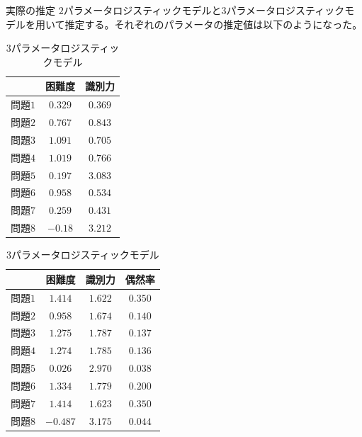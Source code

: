 \documentclass[aspectratio=169, dvipdfmx, 12pt]{beamer}
\begin{document}
\begin{frame}
  \begin{block}{実際の推定}
    $2$パラメータロジスティックモデルと$3$パラメータロジスティックモデルを用いて推定する。それぞれのパラメータの推定値は以下のようになった。
    \begin{table}[H]
      \begin{minipage}[t]{.45\textwidth}
        \begin{center}
          \begin{tabular}{|l||c|c|} \hline
            & 困難度& 識別力 \\ \hline \hline
            問題$1$ & $0.329$ & $0.369$  \\ \hline
            問題$2$ & $0.767$ & $0.843$  \\ \hline
            問題$3$ & $1.091$ & $0.705$   \\ \hline
            問題$4$ & $1.019$ & $0.766$   \\ \hline
            問題$5$ & $0.197$ & $3.083$   \\ \hline
            問題$6$ & $0.958$ & $0.534$   \\ \hline
            問題$7$ & $0.259$ & $0.431$   \\ \hline
            問題$8$ & $-0.18$ & $3.212$   \\ \hline
          \end{tabular}
        \end{center}
        \caption{$2$パラメータロジスティックモデル}
      \end{minipage}
      \begin{minipage}[t]{.45\textwidth}
        \vspace{-2.5cm}
        \begin{center}
          \begin{tabular}{|l||c|c|c|} \hline
            & 困難度& 識別力 & 偶然率\\ \hline \hline
            問題$1$ & $1.414$ & $1.622$ &$0.350$ \\ \hline
            問題$2$ & $0.958$ & $1.674$ &$0.140$ \\ \hline
            問題$3$ & $1.275$ & $1.787$ &$0.137$ \\ \hline
            問題$4$ & $1.274$ & $1.785$ &$0.136$ \\ \hline
            問題$5$ & $0.026$ & $2.970$ &$0.038$ \\ \hline
            問題$6$ & $1.334$ & $1.779$ &$0.200$ \\ \hline
            問題$7$ & $1.414$ & $1.623$ &$0.350$ \\ \hline
            問題$8$ & $-0.487$ & $3.175$ &$0.044$ \\ \hline
          \end{tabular}
        \end{center}
        \caption{$3$パラメータロジスティックモデル}
      \end{minipage}
    \end{table}
\end{block}
\end{frame}
\end{document}
